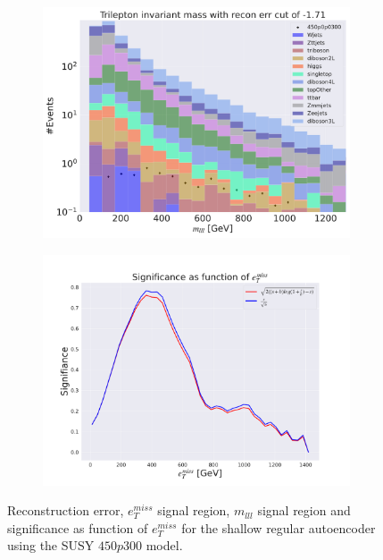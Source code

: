 \begin{figure}[H]
    \hfill
    \begin{subfigure}{.49\textwidth}
        \includegraphics[width=\textwidth]{Figures/AE_testing/small/3lep/b_data_recon_big_rm3_feats_sig_450p0p0300_mlll_recon_errcut_-1.71.pdf}
        \caption{}
        \label{fig:AE_3lep_small_mlll_450}
    \end{subfigure}
    \hfill   
    \begin{subfigure}{.49\textwidth}
        \includegraphics[width=\textwidth]{Figures/AE_testing/small/3lep/significance_etmiss_450p0p0300_-1.7067960296617328.pdf}
        \caption{}
        \label{fig:AE_3lep_small_signi_450}
    \end{subfigure}
    \hfill      
    \caption[3lep shallow network | $450p300$ | AE]{Reconstruction error, $e_T^{miss}$ signal region, $m_{lll}$ signal region and significance as function of 
    $e_T^{miss}$ for the shallow regular autoencoder using the SUSY $450p300$ model.}
    \label{fig:AE_3lep_small_rec_sig_signi_450}
\end{figure}








